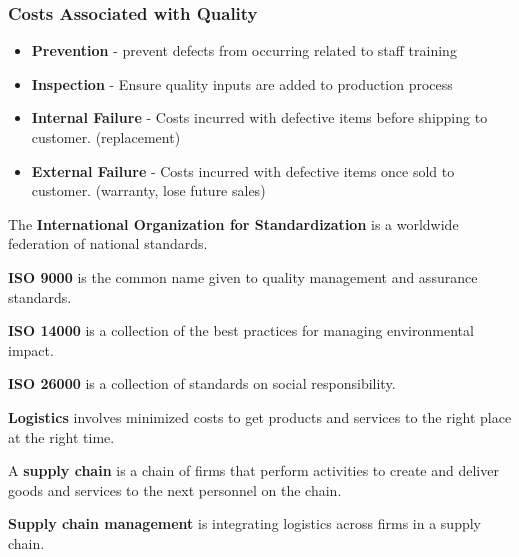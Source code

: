 \documentclass[english, 12pt]{article}
\begin{document}
\subsubsection*{Costs Associated with Quality}
\begin{itemize}
\item \textbf{Prevention} - prevent defects from occurring related to staff training
\item \textbf{Inspection} - Ensure quality inputs are added to production process
\item \textbf{Internal Failure} - Costs incurred with defective items before shipping to customer. (replacement)
\item \textbf{External Failure} - Costs incurred with defective items once sold to customer. (warranty, lose future sales)
\end{itemize}
\begin{defn}
The \textbf{International Organization for Standardization} is a worldwide federation of national standards.
\end{defn}
\begin{defn}
\textbf{ISO 9000} is the common name given to quality management and assurance standards.
\end{defn}
\begin{defn}
\textbf{ISO 14000} is a collection of the best practices for managing environmental impact.
\end{defn}
\begin{defn}
\textbf{ISO 26000} is a collection of standards on social responsibility.
\end{defn}
\begin{defn}
\textbf{Logistics} involves minimized costs to get products and services to the right place at the right time.
\end{defn}
\begin{defn}
A \textbf{supply chain} is a chain of firms that perform activities to create and deliver goods and services to the next personnel on the chain.
\end{defn}
\begin{defn}
\textbf{Supply chain management} is integrating logistics across firms in a supply chain.
\end{defn}
\end{document}
